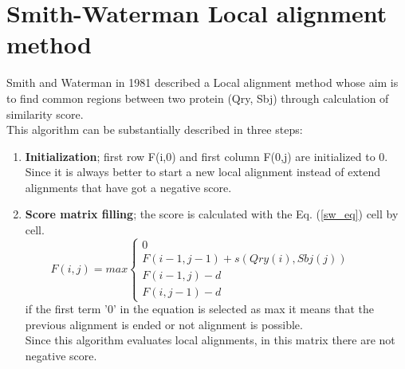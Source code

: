 \section{Smith-Waterman Local alignment method	}
Smith and Waterman in 1981 described a Local alignment method whose aim  is to find common regions between two protein (Qry, Sbj) through calculation of similarity score. \\
This algorithm can be substantially described in three steps:
\begin{enumerate}
	\item  \textbf{Initialization}; first row F(i,0) and first column F(0,j) are initialized to 0. Since it is always better to start a new local alignment instead of extend alignments that have got a negative score.
	 \item \textbf{Score matrix filling}; the score is calculated with the Eq. (\ref{sw_eq}) cell by cell.\\
	 \begin{equation}\label{sw_eq}
	 F(i,j) = max \begin{cases}
	
	 0 & \\
	  F(i-1,j-1) + s(Qry(i),Sbj(j))\qquad &\\
	   F(i-1,j)-d &\\
	   F(i,j-1)-d &
	 \end{cases} 
	 \end{equation}
	  if the first term '0' in the equation is selected as max it means that the previous alignment is ended or not alignment is possible. \\Since this algorithm evaluates local alignments, in this matrix there are not negative score.
	 
	
\end{enumerate}

